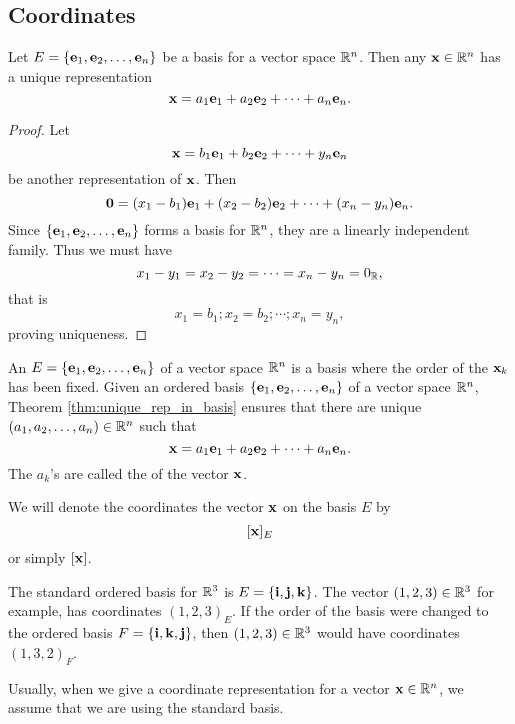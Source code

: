 \subsection{Coordinates}
\begin{thm}
Let $E=\{\mathbf{ e}_1, \mathbf{ e}_2, \ldots, \mathbf{ e}_n\}$ be a basis for a
vector space $\mathbb{R}^n$. Then any $\mathbf{ x}\in \mathbb{R}^n$ has a unique
representation $$\mathbf{ x} = a_1\mathbf{ e}_1 + a_2\mathbf{ e}_2 + \cdots +
a_n\mathbf{ e}_n.    $$ \label{thm:unique_rep_in_basis}\end{thm}
\begin{proof}
Let $$\mathbf{ x} = b_1\mathbf{ e}_1 + b_2\mathbf{ e}_2 + \cdots + y_n \mathbf{ e}_n
$$be another representation of $\mathbf{ x}$. Then $$\mathbf{ 0} =
(x_1 - b_1)\mathbf{ e}_1 + (x_2 - b_2)\mathbf{ e}_2 + \cdots + (x_n -
y_n )\mathbf{ e}_n.    $$Since $\{\mathbf{ e}_1, \mathbf{ e}_2, \ldots, \mathbf{ e}_n\}$
forms a basis for $\mathbb{R}^n$, they are a linearly independent family. Thus
we must have $$ x_1 - y_1= x_2 - y_2 = \cdots = x_n - y_n = 0_{\mathbb{R}
},
$$ that is
$$x_1 = b_1; x_2 = b_2; \cdots ;x_n = y_n ,   $$proving uniqueness.
\end{proof}
\begin{df}
An  $E=\{\mathbf{ e}_1, \mathbf{ e}_2, \ldots, \mathbf{ e}_n\}$ of a
vector space $\mathbb{R}^n$ is a basis where the order of the $\mathbf{ x}_k$ has
been fixed. Given an ordered basis $\{\mathbf{ e}_1, \mathbf{ e}_2, \ldots,
\mathbf{ e}_n\}$ of a vector space $\mathbb{R}^n$, Theorem
\ref{thm:unique_rep_in_basis} ensures that there are unique $(a_1,
a_2, \ldots, a_n)\in \mathbb{R} ^n$ such that
$$\mathbf{ x} = a_1\mathbf{ e}_1 + a_2\mathbf{ e}_2 + \cdots +
a_n\mathbf{ e}_n.    $$ The $a_k$'s are called the  of
the vector $\mathbf{ x}$.

We will denote the coordinates the vector $\mathbf{ x}$ on the basis $E$ by 
\[[\mathbf{ x}]_E\]
or simply $[\mathbf{ x}]$.
\end{df}



\begin{exa} The standard ordered basis for $\mathbb{R}^3$ is $E = \{\mathbf{ i}, \mathbf{ j}, \mathbf{ k}\}$.
The vector $\left( 1, 2, 3 \right)\in \mathbb{R}^3$ for example, has
coordinates $(1, 2, 3)_E$. If the order of the basis were
changed to the ordered basis $F =
\{\mathbf{ i}, \mathbf{ k}, \mathbf{ j}\}$, then $\left( 1, 2,
3 \right)\in \mathbb{R}^3$ would have  coordinates $(1, 3, 2)_F$.
\end{exa}

\begin{rem}
Usually, when we give a coordinate representation for a vector
$\mathbf{ x}\in \mathbb{R}^n$, we assume that we are using the standard basis.
\end{rem}

